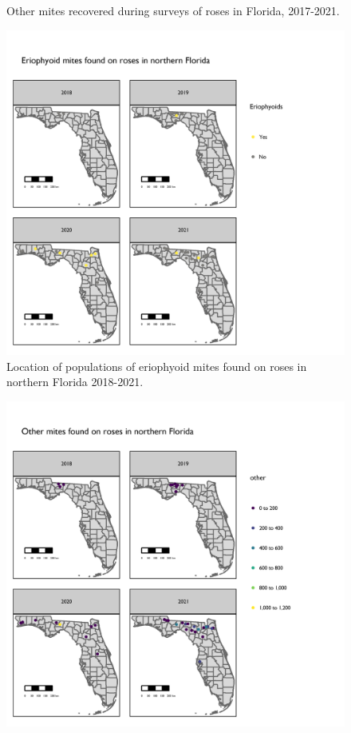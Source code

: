\documentclass[12pt,final,CPage]{ufthesis}
\begin{document}
{\begin{figure}[p]
{  }

  \caption[Other mites recovered during surveys of roses in Florida]{Other mites recovered during surveys of roses in Florida, 2017-2021.}\label{fig:survey-map-2}
  \end{figure}
  \begin{figure}[p]

  {\centering \includegraphics[width=1\linewidth]{figure/rrv_survey_map_years_pf} 

  }

  \caption[Location of populations of eriophyoid mites found on roses in northern Florida]{Location of populations of eriophyoid mites found on roses in northern Florida 2018-2021.}\label{fig:survey-map-3}
  \end{figure}
  \begin{figure}[p]

  {\centering \includegraphics[width=1\linewidth]{figure/rrv_survey_map_years_others} 

}
\end{figure}}
\end{document}
